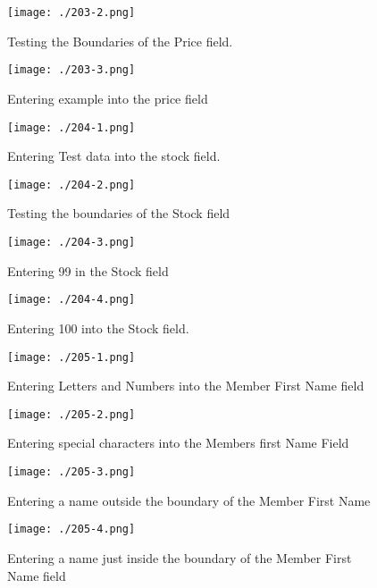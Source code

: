 \begin{figure}[H]
    \texttt{[image: ./203-2.png]}
    \caption{Testing the Boundaries of the Price field.} \label{fig:203-2}
\end{figure}

\begin{figure}[H]
    \texttt{[image: ./203-3.png]}
    \caption{Entering example into the price field} \label{fig:203-3}
\end{figure}

\begin{figure}[H]
    \texttt{[image: ./204-1.png]}
    \caption{Entering Test data into the stock field.} \label{fig:204-1}
\end{figure}

\begin{figure}[H]
    \texttt{[image: ./204-2.png]}
    \caption{Testing the boundaries of the Stock field} \label{fig:204-2}
\end{figure}

\begin{figure}[H]
    \texttt{[image: ./204-3.png]}
    \caption{Entering 99 in the Stock field} \label{fig:204-3}
\end{figure}

\begin{figure}[H]
    \texttt{[image: ./204-4.png]}
    \caption{Entering 100 into the Stock field.} \label{fig:204-4}
\end{figure}

\begin{figure}[H]
    \texttt{[image: ./205-1.png]}
    \caption{Entering Letters and Numbers into the Member First Name field} \label{fig:205-1}
\end{figure}

\begin{figure}[H]
    \texttt{[image: ./205-2.png]}
    \caption{Entering special characters into the Members first Name Field} \label{fig:205-2}
\end{figure}

\begin{figure}[H]
    \texttt{[image: ./205-3.png]}
    \caption{Entering a name outside the boundary of the Member First Name} \label{fig:205-3}
\end{figure}

\begin{figure}[H]
    \texttt{[image: ./205-4.png]}
    \caption{Entering a name just inside the boundary of the Member First Name field} \label{fig:205-4}
\end{figure}

